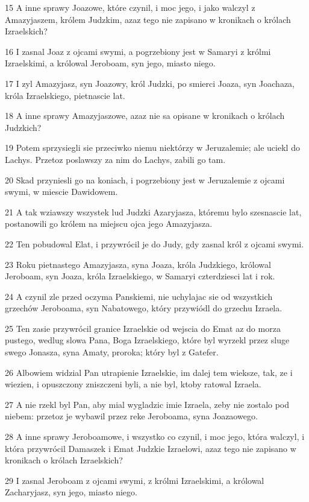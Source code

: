 \par 15 A inne sprawy Joazowe, które czynil, i moc jego, i jako walczyl z Amazyjaszem, królem Judzkim, azaz tego nie zapisano w kronikach o królach Izraelskich?
\par 16 I zasnal Joaz z ojcami swymi, a pogrzebiony jest w Samaryi z królmi Izraelskimi, a królowal Jeroboam, syn jego, miasto niego.
\par 17 I zyl Amazyjasz, syn Joazowy, król Judzki, po smierci Joaza, syn Joachaza, króla Izraelskiego, pietnascie lat.
\par 18 A inne sprawy Amazyjaszowe, azaz nie sa opisane w kronikach o królach Judzkich?
\par 19 Potem sprzysiegli sie przeciwko niemu niektórzy w Jeruzalemie; ale uciekl do Lachys. Przetoz poslawszy za nim do Lachys, zabili go tam.
\par 20 Skad przyniesli go na koniach, i pogrzebiony jest w Jeruzalemie z ojcami swymi, w miescie Dawidowem.
\par 21 A tak wziawszy wszystek lud Judzki Azaryjasza, któremu bylo szesnascie lat, postanowili go królem na miejscu ojca jego Amazyjasza.
\par 22 Ten pobudowal Elat, i przywrócil je do Judy, gdy zasnal król z ojcami swymi.
\par 23 Roku pietnastego Amazyjasza, syna Joaza, króla Judzkiego, królowal Jeroboam, syn Joaza, króla Izraelskiego, w Samaryi czterdziesci lat i rok.
\par 24 A czynil zle przed oczyma Panskiemi, nie uchylajac sie od wszystkich grzechów Jeroboama, syn Nabatowego, który przywiódl do grzechu Izraela.
\par 25 Ten zasie przywrócil granice Izraelskie od wejscia do Emat az do morza pustego, wedlug slowa Pana, Boga Izraelskiego, które byl wyrzekl przez sluge swego Jonasza, syna Amaty, proroka; który byl z Gatefer.
\par 26 Albowiem widzial Pan utrapienie Izraelskie, im dalej tem wieksze, tak, ze i wiezien, i opuszczony zniszczeni byli, a nie byl, ktoby ratowal Izraela.
\par 27 A nie rzekl byl Pan, aby mial wygladzic imie Izraela, zeby nie zostalo pod niebem: przetoz je wybawil przez reke Jeroboama, syna Joazaowego.
\par 28 A inne sprawy Jeroboamowe, i wszystko co czynil, i moc jego, która walczyl, i która przywrócil Damaszek i Emat Judzkie Izraelowi, azaz tego nie zapisano w kronikach o królach Izraelskich?
\par 29 I zasnal Jeroboam z ojcami swymi, z królmi Izraelskimi, a królowal Zacharyjasz, syn jego, miasto niego.

